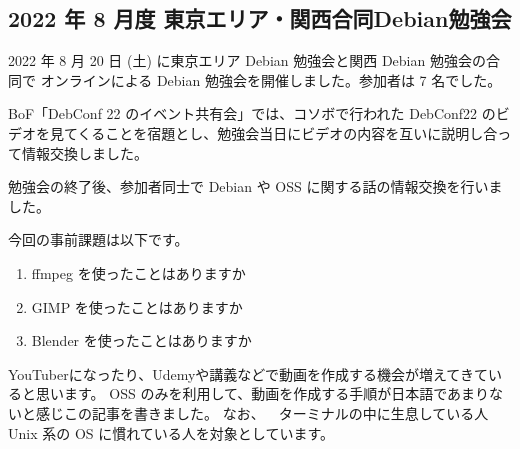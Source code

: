\documentclass[mingoth,a4paper]{jsarticle}
\begin{document}

\subsection{2022 年 8 月度 東京エリア・関西合同Debian勉強会}

2022 年 8 月 20 日 (土) に東京エリア Debian 勉強会と関西 Debian 勉強会の合同で
オンラインによる Debian 勉強会を開催しました。参加者は 7 名でした。

BoF「DebConf 22 のイベント共有会」では、コソボで行われた DebConf22 のビデオを見てくることを宿題とし、勉強会当日にビデオの内容を互いに説明し合って情報交換しました。

勉強会の終了後、参加者同士で Debian や OSS に関する話の情報交換を行いました。


今回の事前課題は以下です。

\begin{enumerate}
\item ffmpeg を使ったことはありますか
\item GIMP を使ったことはありますか
\item Blender を使ったことはありますか
\end{enumerate}


\begin{multicols}{2}
{\small

}
\end{multicols}

%
%
%
%


      

YouTuberになったり、Udemyや講義などで動画を作成する機会が増えてきていると思います。
OSS のみを利用して、動画を作成する手順が日本語であまりないと感じこの記事を書きました。
なお、~~ターミナルの中に生息している人~~ Unix 系の OS に慣れている人を対象としています。
\end{document}
